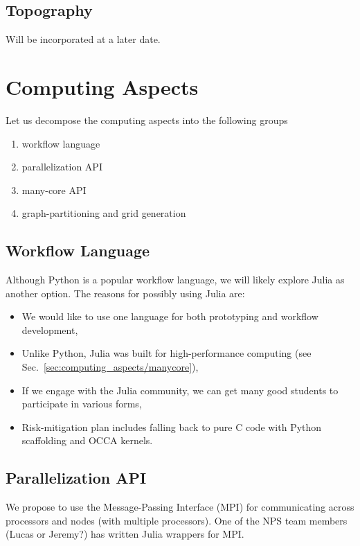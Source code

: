 \documentclass[12pt]{article}
\begin{document}
\subsection{Topography}
Will be incorporated at a later date.




\section{Computing Aspects}
\label{sec:computing_aspects}

Let us decompose the computing aspects into the following groups
\begin{enumerate}
\item workflow language
\item parallelization API
\item many-core API
\item graph-partitioning and grid generation

\end{enumerate}

\subsection{Workflow Language}
Although Python is a popular workflow language, we will likely explore Julia as another option.  The reasons for possibly using Julia are: 
\begin{itemize}
\item We would like to use one language for both prototyping and workflow development,
\item Unlike Python, Julia was built for high-performance computing (see Sec.\ \ref{sec:computing_aspects/manycore}),
\item If we engage with the Julia community, we can get many good students to participate in various forms,
\item Risk-mitigation plan includes falling back to pure C code with Python scaffolding and OCCA kernels.
\end{itemize} 

\subsection{Parallelization API}
We propose to use the Message-Passing Interface (MPI) for communicating across processors and nodes (with multiple processors).  One of the NPS team members (Lucas or Jeremy?) has written Julia wrappers for MPI.
\end{document}
